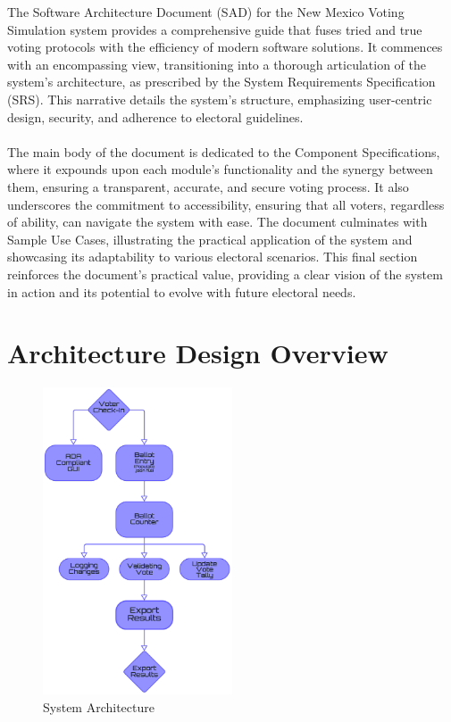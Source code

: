 \documentclass{article}
\begin{document}
The Software Architecture Document (SAD) for the New Mexico Voting Simulation system provides a comprehensive guide that fuses tried and true voting protocols with the efficiency of modern software solutions. It commences with an encompassing view, transitioning into a thorough articulation of the system's architecture, as prescribed by the System Requirements Specification (SRS). This narrative details the system’s structure, emphasizing user-centric design, security, and adherence to electoral guidelines. \\ \\
The main body of the document is dedicated to the Component Specifications, where it expounds upon each module's functionality and the synergy between them, ensuring a transparent, accurate, and secure voting process. It also underscores the commitment to accessibility, ensuring that all voters, regardless of ability, can navigate the system with ease. The document culminates with Sample Use Cases, illustrating the practical application of the system and showcasing its adaptability to various electoral scenarios. This final section reinforces the document's practical value, providing a clear vision of the system in action and its potential to evolve with future electoral needs.

\section{Architecture Design Overview}

\begin{figure}
\vspace{-\baselineskip}
\centering
\includegraphics[width=0.5\textwidth]{docs/sad/figures/architecture.png}
\caption{System Architecture}
\label{fig:architecture}
\end{figure}
\end{document}
